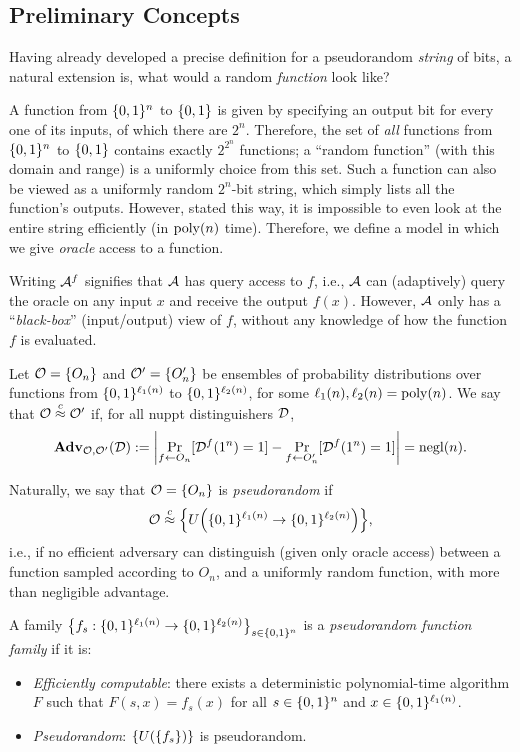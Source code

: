 \documentclass[11pt]{article}
\begin{document}
\subsection{Preliminary Concepts}
\label{sec:preliminary-concepts}

Having already developed a precise definition for a pseudorandom
\emph{string} of bits, a natural extension is, what would a random
\emph{function} look like?

A function from $\bit^{n}$ to $\bit$ is given by specifying an output
bit for every one of its inputs, of which there are $2^{n}$.
Therefore, the set of \emph{all} functions from $\bit^{n}$ to $\bit$
contains exactly $2^{2^{n}}$ functions; a ``random function'' (with
this domain and range) is a uniformly choice from this set.  Such a
function can also be viewed as a uniformly random $2^{n}$-bit string,
which simply lists all the function's outputs.  However, stated this
way, it is impossible to even look at the entire string efficiently
(in $\poly(n)$ time).  Therefore, we define a model in which we give
\emph{oracle} access to a function.

Writing $\Adv^{f}$ signifies that $\Adv$ has query access to $f$,
i.e., $\Adv$ can (adaptively) query the oracle on any input $x$ and
receive the output $f(x)$.  However, $\Adv$ only has a
``\emph{black-box}'' (input/output) view of $f$, without any knowledge
of how the function $f$ is evaluated.

\begin{definition}
  Let $\Ora = \{O_{n}\}$ and $\Ora'=\{O'_{n}\}$ be ensembles of
  probability distributions over functions from
  $\bit^{\ell_{1}(n)}$ to $\bit^{\ell_{2}(n)}$, for some
  $\ell_{1}(n), \ell_{2}(n) = \poly(n)$.  We say that $\Ora \compind
  \Ora'$ if, for all nuppt distinguishers $\Dist$,
  \[\advan_{\Ora,\Ora'}(\Dist) :=
  \abs*{\Pr_{f \gets O_{n}}[\Dist^{f}(1^n) = 1] - \Pr_{f \gets
      O'_{n}}[\Dist^{f}(1^n) = 1]} = \negl(n). \]
\end{definition}

Naturally, we say that $\Ora = \{O_{n}\}$ is \emph{pseudorandom} if \[
\Ora \compind \set*{U\parens*{\bit^{\ell_{1}(n)} \to
    \bit^{\ell_{2}(n)}}}, \] i.e., if no efficient adversary can
distinguish (given only oracle access) between a function sampled
according to $O_n$, and a uniformly random function, with more than
negligible advantage.

\begin{definition}
  A family $\set*{f_{s}: \bit^{\ell_{1}(n)} \rightarrow
    \bit^{\ell_2(n)}}_{s \in \bit^{n}}$ is a \emph{pseudorandom
    function family} if it is:
  \begin{itemize}
  \item \emph{Efficiently computable}: there exists a deterministic
    polynomial-time algorithm $F$ such that $F(s,x) = f_{s}(x)$ for
    all $s \in \bit^{n}$ and $x \in \bit^{\ell_{1}(n)}$.
  \item \emph{Pseudorandom}: $\set*{U(\set{f_{s}})}$ is
    pseudorandom.
  \end{itemize}
\end{definition}
\end{document}
